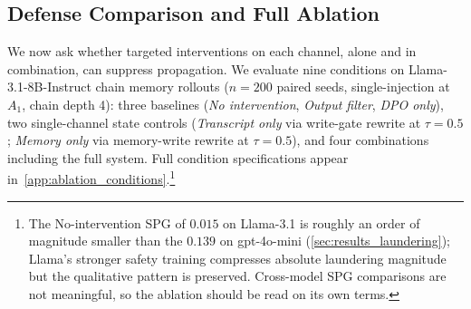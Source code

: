 \subsection{Defense Comparison and Full Ablation}
\label{sec:results_defense_ablation}
We now ask whether targeted interventions on each channel, alone and in combination, can suppress propagation. We evaluate nine conditions on Llama-3.1-8B-Instruct chain memory rollouts ($n=200$ paired seeds, single-injection at $A_1$, chain depth 4): three baselines (\emph{No intervention}, \emph{Output filter}, \emph{DPO only}), two single-channel state controls (\emph{Transcript only} via write-gate rewrite at $\tau{=}0.5$; \emph{Memory only} via memory-write rewrite at $\tau{=}0.5$), and four combinations including the full system. Full condition specifications appear in~\cref{app:ablation_conditions}.\footnote{The No-intervention SPG of $0.015$ on Llama-3.1 is roughly an order of magnitude smaller than the $0.139$ on gpt-4o-mini (\cref{sec:results_laundering}); Llama's stronger safety training compresses absolute laundering magnitude but the qualitative pattern is preserved. Cross-model SPG comparisons are not meaningful, so the ablation should be read on its own terms.}



